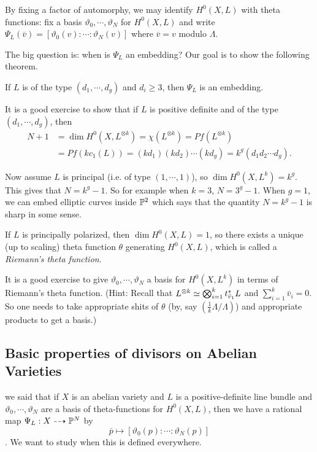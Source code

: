 By fixing a factor of automorphy, we may identify $H^0(X,L)$ with theta functions: fix a basis $\vartheta_0,\cdots,\vartheta_N$ for $H^0(X,L)$ and write $\Psi_L(\overline{v})=[\vartheta_0(v):\cdots:\vartheta_N(v)]$ where $\overline{v}=v$ modulo $\Lambda$. 

The big question is: when is $\Psi_L$ an embedding? Our goal is to show the following theorem.
\begin{theorem}[Lefschetz]
If $L$ is of the type $(d_1,\cdots,d_g)$ and $d_i\geq 3$, then $\Psi_L$ is an embedding.
\end{theorem}

\begin{example}
It is a good exercise to show that if $L$ is positive definite and of the type $(d_1,\cdots,d_g)$, then 
\begin{align*}
N+1 &=\dim H^0(X,L^{\otimes k})=\chi(L^{\otimes k})=Pf(L^{\otimes k})\\
&=Pf(k c_1(L))=(kd_1)(kd_2)\cdots (kd_g)=k^g(d_1d_2\cdots d_g).
\end{align*}

Now assume $L$ is principal (i.e. of type $(1,\cdots,1)$), so $\dim H^0(X,L^k)=k^g$. This gives that $N=k^g-1$. So for example when $k=3$, $N=3^g-1$. When $g=1$, we can embed elliptic curves inside ${\mathbb P}^2$ which says that the quantity $N=k^g-1$ is sharp in some sense. 
\end{example}

If $L$ is principally polarized, then $\dim H^0(X,L)=1$, so there exists a unique (up to scaling) theta function $\theta$ generating $H^0(X,L)$, which is called a \emph{Riemann's theta function}. 

It is a good exercise to give $\vartheta_0,\cdots,\vartheta_N$ a basis for $H^0(X,L^{k})$ in terms of Riemann's theta function. (Hint: Recall that $L^{\otimes k}\simeq \bigotimes_{i=1}^k t_{\bar{v}_1}^* L$ and $\sum_{i=1}^k \bar{v}_i=0$. So one needs to take appropriate shits of $\theta$ (by, say $(\frac{1}{k}\Lambda/\Lambda)$) and appropriate products to get a basis.)

\subsection{Basic properties of divisors on Abelian Varieties}
we said that if $X$ is an abelian variety and $L$ is a positive-definite line bundle and $\vartheta_0,\cdots, \vartheta_N$ are a basis of theta-functions for $H^0(X,L)$, then we have a rational map $\Psi_L: X\dashrightarrow {\mathbb P}^N$ by
$$\bar{p}\mapsto [\vartheta_0(p):\cdots:\vartheta_N(p)]$$. We want to study when this is defined everywhere.

